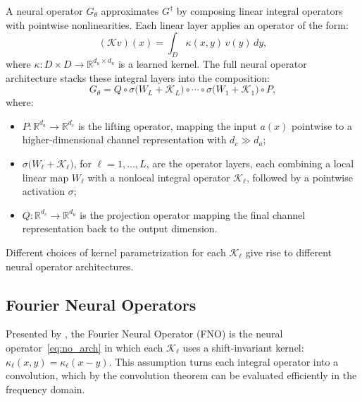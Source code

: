 A neural operator $G_\theta$ approximates $G^\dagger$ by composing linear integral operators with pointwise nonlinearities. Each linear layer applies an operator of the form:
\begin{equation}
    (\mathcal{K} v)(x) = \int_{D} \kappa(x, y)\,v(y)\,dy,
\end{equation}
where $\kappa : D \times D \to \mathbb{R}^{d_u \times d_u}$ is a learned kernel. The full neural operator architecture stacks these integral layers into the composition:
\begin{equation}\label{eq:no_arch}
    G_\theta = Q \circ \sigma\Big(W_L + \mathcal{K}_L\Big) \circ \cdots \circ \sigma\Big(W_1 + \mathcal{K}_1\Big) \circ P,
\end{equation}
\noindent where:
\begin{itemize}
    \item $P : \mathbb{R}^{d_a} \to \mathbb{R}^{d_c}$ is the lifting operator, mapping the input $a(x)$ pointwise to a higher-dimensional channel representation with $d_c \gg d_a$;
    \item $\sigma\!\Big(W_\ell + \mathcal{K}_\ell\Big)$, for $\ell = 1, \ldots, L$, are the operator layers, each combining a local linear map $W_\ell$ with a nonlocal integral operator $\mathcal{K}_\ell$, followed by a pointwise activation $\sigma$;
    \item $Q : \mathbb{R}^{d_c} \to \mathbb{R}^{d_u}$ is the projection operator mapping the final channel representation back to the output dimension.
\end{itemize}
Different choices of kernel parametrization for each $\mathcal{K}_\ell$ give rise to different neural operator architectures.

\subsection{Fourier Neural Operators}
\label{subsec:fno}

Presented by \textcite{li2020fourier}, the Fourier Neural Operator (FNO) is the neural operator~\eqref{eq:no_arch} in which each $\mathcal{K}_\ell$ uses a shift-invariant kernel: $\kappa_\ell(x, y) = \kappa_\ell(x - y)$. This assumption turns each integral operator into a convolution, which by the convolution theorem can be evaluated efficiently in the frequency domain.

